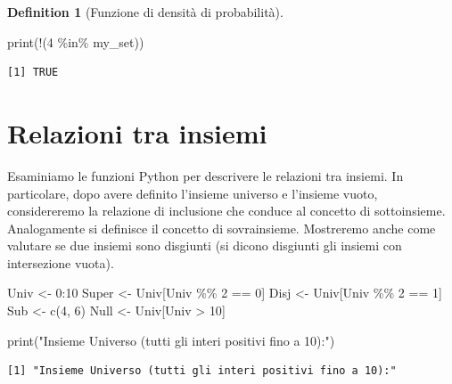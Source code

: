 \documentclass[
  letterpaper,
  DIV=11,
  numbers=noendperiod,
  oneside]{scrreprt}
\newenvironment{Shaded}{\begin{snugshade}}{\end{snugshade}}
\newcommand{\DecValTok}[1]{\textcolor[rgb]{0.68,0.00,0.00}{#1}}
\newcommand{\FunctionTok}[1]{\textcolor[rgb]{0.28,0.35,0.67}{#1}}
\newcommand{\NormalTok}[1]{\textcolor[rgb]{0.00,0.23,0.31}{#1}}
\newcommand{\OtherTok}[1]{\textcolor[rgb]{0.00,0.23,0.31}{#1}}
\newcommand{\SpecialCharTok}[1]{\textcolor[rgb]{0.37,0.37,0.37}{#1}}
\newcommand{\StringTok}[1]{\textcolor[rgb]{0.13,0.47,0.30}{#1}}
\theoremstyle{definition}
\theoremstyle{plain}
\theoremstyle{definition}
\newtheorem{definition}{Definition}[chapter]
\theoremstyle{remark}
\begin{document}
\begin{definition}[Funzione di densità di
probabilità]
\begin{Shaded}
\begin{Highlighting}[]
\FunctionTok{print}\NormalTok{(}\SpecialCharTok{!}\NormalTok{(}\DecValTok{4} \SpecialCharTok{\%in\%}\NormalTok{ my\_set))}
\end{Highlighting}
\end{Shaded}

\begin{verbatim}
[1] TRUE
\end{verbatim}

\section{Relazioni tra insiemi}\label{relazioni-tra-insiemi}

Esaminiamo le funzioni Python per descrivere le relazioni tra insiemi.
In particolare, dopo avere definito l'insieme universo e l'insieme
vuoto, considereremo la relazione di inclusione che conduce al concetto
di sottoinsieme. Analogamente si definisce il concetto di sovrainsieme.
Mostreremo anche come valutare se due insiemi sono disgiunti (si dicono
disgiunti gli insiemi con intersezione vuota).

\begin{Shaded}
\begin{Highlighting}[]
\NormalTok{Univ }\OtherTok{\textless{}{-}} \DecValTok{0}\SpecialCharTok{:}\DecValTok{10}
\NormalTok{Super }\OtherTok{\textless{}{-}}\NormalTok{ Univ[Univ }\SpecialCharTok{\%\%} \DecValTok{2} \SpecialCharTok{==} \DecValTok{0}\NormalTok{]}
\NormalTok{Disj }\OtherTok{\textless{}{-}}\NormalTok{ Univ[Univ }\SpecialCharTok{\%\%} \DecValTok{2} \SpecialCharTok{==} \DecValTok{1}\NormalTok{]}
\NormalTok{Sub }\OtherTok{\textless{}{-}} \FunctionTok{c}\NormalTok{(}\DecValTok{4}\NormalTok{, }\DecValTok{6}\NormalTok{)}
\NormalTok{Null }\OtherTok{\textless{}{-}}\NormalTok{ Univ[Univ }\SpecialCharTok{\textgreater{}} \DecValTok{10}\NormalTok{]}
\end{Highlighting}
\end{Shaded}

\begin{Shaded}
\begin{Highlighting}[]
\FunctionTok{print}\NormalTok{(}\StringTok{"Insieme Universo (tutti gli interi positivi fino a 10):"}\NormalTok{)}
\end{Highlighting}
\end{Shaded}

\begin{verbatim}
[1] "Insieme Universo (tutti gli interi positivi fino a 10):"
\end{verbatim}


\end{definition}
\end{document}
